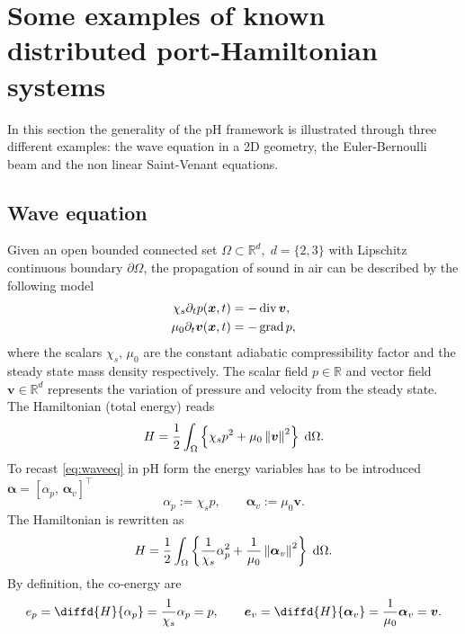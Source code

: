 \section{Some examples of known distributed port-Hamiltonian systems}

In this section the generality of the pH framework is illustrated through three different examples: the wave equation in a 2D geometry, the Euler-Bernoulli beam and the non linear Saint-Venant equations. 

\subsection{Wave equation}\label{sec:waveeq}

Given an open bounded connected set $\Omega \subset \mathbb{R}^d, \; d=\{2,3\}$ with Lipschitz continuous boundary $\partial\Omega$, the propagation of sound in air can be described by the following model \cite{trenchant2018}
\begin{equation}\label{eq:waveeq}
\begin{aligned}
\chi_s \partial_{t} p(\bm{x}, t) &=-\operatorname{div} \bm{v}, \\
\mu_0 \partial_{t} \bm{v}(\bm{x}, t) &= -\operatorname*{grad} p, \\
\end{aligned}
\end{equation}
where the scalars $\chi_s, \, \mu_0$ are the constant adiabatic compressibility factor and the steady state mass density respectively. The scalar field $p \in \mathbb{R}$ and vector field $\bm{v} \in \mathbb{R}^d$ represents the variation of pressure and velocity from the steady state. The Hamiltonian (total energy) reads
\begin{equation*}
H = \frac{1}{2} \int_{\Omega} \left\{\chi_s p^2 + {\mu_0}\norm{\bm{v}}^2 \right\} \d\Omega.
\end{equation*}
To recast \eqref{eq:waveeq} in pH form the energy variables has to be introduced $\bm{\alpha} = [\alpha_p, \, \bm{\alpha}_v]^\top$
\begin{equation*}
\alpha_p := \chi_s p, \qquad \bm{\alpha}_v := \mu_0 \bm{v}.
\end{equation*} 
The Hamiltonian is rewritten as
\begin{equation*}
H = \frac{1}{2} \int_{\Omega} \left\{\frac{1}{\chi_s}\alpha_p^2 + \frac{1}{\mu_0} \norm{\bm{\alpha}_v}^2 \right\} \d\Omega.
\end{equation*}
By definition, the co-energy are 
\begin{equation*}
e_p = \diffd{H}{\alpha_p} = \frac{1}{\chi_s}\alpha_p = p, \qquad \bm{e}_v = \diffd{H}{\bm{\alpha}_v} = \frac{1}{\mu_0} \bm{\alpha}_v = \bm{v}.
\end{equation*}
